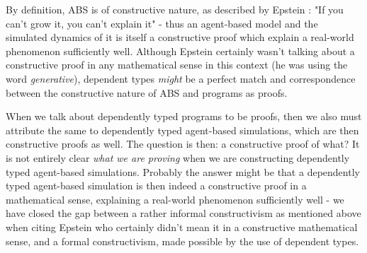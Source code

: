 By definition, ABS is of constructive nature, as described by Epstein \cite{epstein_chapter_2006}: "If you can't grow it, you can't explain it" - thus an agent-based model and the simulated dynamics of it is itself a constructive proof which explain a real-world phenomenon sufficiently well. Although Epstein certainly wasn't talking about a constructive proof in any mathematical sense in this context (he was using the word \textit{generative}), dependent types \textit{might} be a perfect match and correspondence between the constructive nature of ABS and programs as proofs.

When we talk about dependently typed programs to be proofs, then we also must attribute the same to dependently typed agent-based simulations, which are then constructive proofs as well. The question is then: a constructive proof of what? It is not entirely clear \textit{what we are proving} when we are constructing dependently typed agent-based simulations. Probably the answer might be that a dependently typed agent-based simulation is then indeed a constructive proof in a mathematical sense, explaining a real-world phenomenon sufficiently well - we have closed the gap between a rather informal constructivism as mentioned above when citing Epstein who certainly didn't mean it in a constructive mathematical sense, and a formal constructivism, made possible by the use of dependent types.